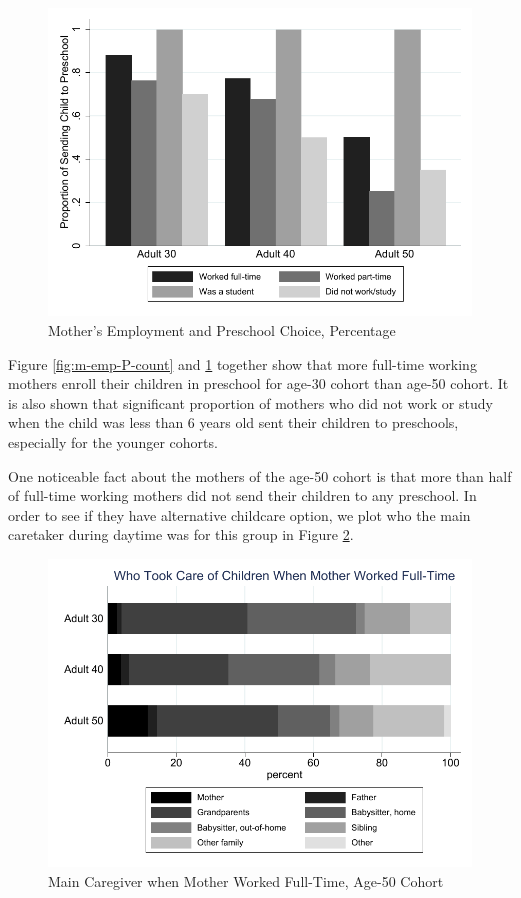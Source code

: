 \begin{figure}[H] \caption{Mother's Employment and Preschool Choice, Percentage} \label{fig:m-emp-P-perc}
\centering
\includegraphics[scale=0.9]{../../../../output/image/bar_momworkpreschool_mean.pdf}
\end{figure}

Figure \ref{fig:m-emp-P-count} and \ref{fig:m-emp-P-perc} together show that more full-time working mothers enroll their children in preschool for age-30 cohort than age-50 cohort. It is also shown that significant proportion of mothers who did not work or study when the child was less than 6 years old sent their children to preschools, especially for the younger cohorts. 

One noticeable fact about the mothers of the age-50 cohort is that more than half of full-time working mothers did not send their children to any preschool. In order to see if they have alternative childcare option, we plot who the main caretaker during daytime was for this group in Figure \ref{fig:m-maincg}. 

\begin{figure}[H] \caption{Main Caregiver when Mother Worked Full-Time, Age-50 Cohort} \label{fig:m-maincg}
\centering
\includegraphics[scale=0.9]{../../../../output/image/bar_caregiver_momft.pdf}
\end{figure}


